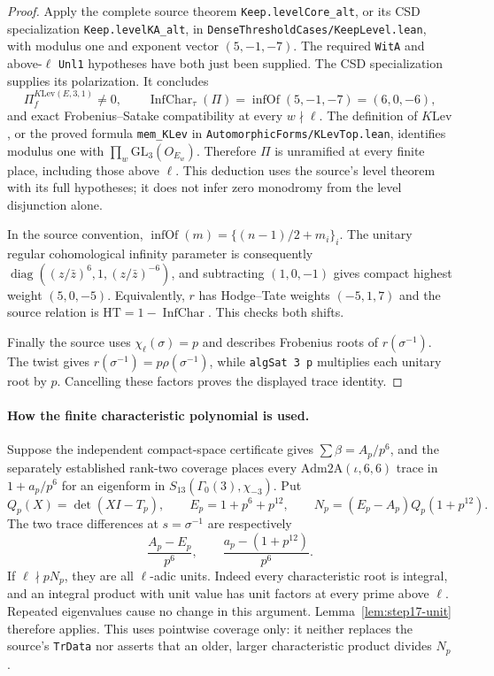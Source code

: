 \begin{proof}
Apply the complete source theorem \texttt{Keep.levelCore\_alt}, or its
CSD specialization \texttt{Keep.levelKA\_alt}, in
\texttt{DenseThresholdCases/KeepLevel.lean}, with modulus one and exponent
vector $(5,-1,-7)$. The required \texttt{WitA} and above-$\ell$
\texttt{Unl1} hypotheses have both just been supplied. The CSD
specialization supplies its polarization. It concludes
\[
 \Pi_f^{K\mathrm{Lev}(E,3,1)}\ne0,
 \qquad \operatorname{InfChar}_\tau(\Pi)
       =\operatorname{infOf}(5,-1,-7)=(6,0,-6),
\]
and exact Frobenius--Satake compatibility at every $w\nmid\ell$.
The definition of $K\mathrm{Lev}$, or the proved formula
\texttt{mem\_KLev} in \texttt{AutomorphicForms/KLevTop.lean}, identifies
modulus one with $\prod_w\mathrm{GL}_3(O_{E_w})$. Therefore $\Pi$ is
unramified at every finite place, including those above $\ell$.
This deduction uses the source's level theorem with its full hypotheses;
it does not infer zero monodromy from the level disjunction alone.

In the source convention,
$\operatorname{infOf}(m)=\{(n-1)/2+m_i\}_i$.
The unitary regular cohomological infinity parameter is consequently
$\operatorname{diag}((z/\bar z)^6,1,(z/\bar z)^{-6})$, and subtracting
$(1,0,-1)$ gives compact highest weight $(5,0,-5)$.
Equivalently, $r$ has Hodge--Tate weights $(-5,1,7)$ and the source relation
is $\mathrm{HT}=1-\operatorname{InfChar}$. This checks both shifts.

Finally the source uses $\chi_\ell(\sigma)=p$ and describes Frobenius
roots of $r(\sigma^{-1})$.
The twist gives $r(\sigma^{-1})=p\rho(\sigma^{-1})$, while
\texttt{algSat 3 p} multiplies each unitary root by $p$.
Cancelling these factors proves the displayed trace identity.
\end{proof}

\paragraph{How the finite characteristic polynomial is used.}
Suppose the independent compact-space certificate gives
$\sum\beta=A_p/p^6$, and the separately established rank-two coverage
places every $\mathrm{Adm2A}(\iota,6,6)$ trace in
$1+a_p/p^6$ for an eigenform in
$S_{13}(\Gamma_0(3),\chi_{-3})$. Put
\[
 Q_p(X)=\det(XI-T_p),\qquad E_p=1+p^6+p^{12},\qquad
 N_p=(E_p-A_p)Q_p(1+p^{12}).
\]
The two trace differences at $s=\sigma^{-1}$ are respectively
\[
 \frac{A_p-E_p}{p^6},\qquad
 \frac{a_p-(1+p^{12})}{p^6}.
\]
If $\ell\nmid pN_p$, they are all $\ell$-adic units. Indeed every
characteristic root is integral, and an integral product with unit value
has unit factors at every prime above $\ell$. Repeated eigenvalues cause
no change in this argument. Lemma~\ref{lem:step17-unit} therefore applies.
This uses pointwise coverage only: it neither replaces the source's
\texttt{TrData} nor asserts that an older, larger characteristic product
divides $N_p$.
